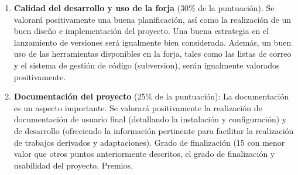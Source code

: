 \begin{enumerate}
\begin{enumerate}
\item {\bf Calidad del desarrollo y uso de la forja} (30\% de la puntuación). Se
valorará positivamente una buena planificación, así como la realización de un
buen diseño e implementación del proyecto. Una buena estrategia en el
lanzamiento de versiones será igualmente bien considerada. Además, un buen uso
de las herramientas disponibles en la forja, tales como las listas de correo y
el sistema de gestión de código (subversion), serán igualmente valorados
positivamente.
\item {\bf Documentación del proyecto} (25\% de la puntuación): La documentación
es un aspecto importante. Se valorará positivamente la realización de
documentación de usuario final (detallando la instalación y configuración) y de
desarrollo (ofreciendo la información pertinente para facilitar la realización
de trabajos derivados y adaptaciones).
Grado de finalización (15%
con menor valor que otros puntos anteriormente descritos, el grado de
finalización y usabilidad del proyecto.
Premios.
\end{enumerate}
\end{enumerate}